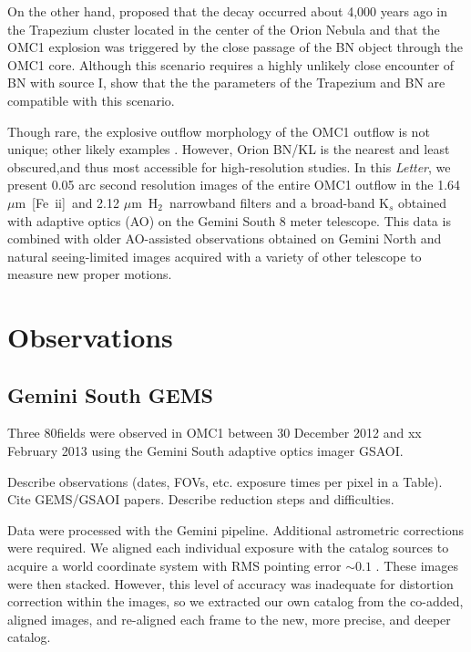 \documentclass[12pt,preprint]{aastex}
\newcommand{\Feii}{[Fe~{\sc ii}]}
\newcommand{\um}{$\mu$m}
\newcommand{\hh}{\ensuremath{\textrm{H}_{2}}}			%
\begin{document}
On the other hand, \citet{Tan2004} proposed that the decay 
occurred about 4,000 years ago in the Trapezium cluster located in the center of
the Orion Nebula and that the OMC1 explosion was
triggered by the close passage of the BN object through the OMC1 core.   Although 
this scenario requires a highly unlikely close encounter of  BN with source I, 
\citet{Tan2013} show that the the parameters of the Trapezium and BN are compatible with 
this scenario.
 
Though rare, the explosive outflow morphology of the  OMC1 outflow is not unique;
other likely examples \citep{Bally2011}.   However, Orion BN/KL is the nearest and least 
obscured,and thus most accessible for high-resolution studies.  
In this {\it Letter}, we present 0.05 arc second resolution images of the 
entire OMC1 outflow in the 1.64 \um\ \Feii\ and 2.12 \um\ \hh\  narrowband filters 
and a broad-band K$_s$ obtained with adaptive optics (AO) on the Gemini South  8 
meter telescope.    This data is combined with  older AO-assisted observations
obtained on Gemini North and natural seeing-limited images acquired with a variety
of other telescope to measure new proper  motions. 


\section{Observations}

\subsection{Gemini South GEMS}

Three 80\arcsec fields were observed in OMC1 between 30 December 2012 and
xx February 2013 using the Gemini South adaptive optics imager GSAOI.

Describe observations (dates, FOVs, etc. exposure times per pixel 
in a Table).    Cite GEMS/GSAOI papers.  Describe reduction steps and
difficulties.

Data were processed with the Gemini pipeline.  Additional astrometric
corrections were required.  We aligned each individual exposure with the
\citet{Muench2002a} catalog sources to acquire a world coordinate system with
RMS pointing error $\sim0.1$ \arcsec.  These images were then stacked.
However, this level of accuracy was inadequate for distortion correction within
the images, so we extracted our own catalog from the co-added, aligned images,
and re-aligned each frame to the new, more precise, and deeper catalog.
\end{document}
